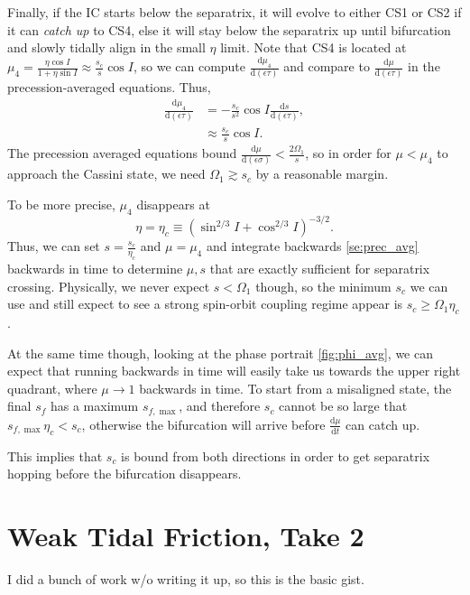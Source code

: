 \documentclass[11pt,
        usenames, %
        dvipsnames %
    ]{article}
\newcommand*{\rd}[2]{\frac{\mathrm{d}#1}{\mathrm{d}#2}}
\newcommand*{\p}[1]{\left(#1\right)}
\begin{document}
Finally, if the IC starts below the separatrix, it will evolve to either CS1 or
CS2 if it can \emph{catch up} to CS4, else it will stay below the separatrix up
until bifurcation and slowly tidally align in the small $\eta$ limit. Note that
CS4 is located at $\mu_4 = \frac{\eta \cos I}{1 + \eta \sin I} \approx
\frac{s_c}{s}\cos I$, so we can compute $\rd{\mu_4}{(\epsilon\tau)}$ and compare
to $\rd{\mu}{(\epsilon\tau)}$ in the precession-averaged equations. Thus,
\begin{align*}
    \rd{\mu_4}{(\epsilon \tau)} &= -\frac{s_c}{s^2}\cos I
            \rd{s}{(\epsilon\tau)},\\
        &\approx \frac{s_c}{s}\cos I.
\end{align*}
The precession averaged equations bound $\rd{\mu}{\p{\epsilon\sigma}} <
\frac{2\Omega_1}{s}$, so in order for $\mu < \mu_4$ to approach the Cassini
state, we need $\Omega_1 \gtrsim s_c$ by a reasonable margin.

To be more precise, $\mu_4$ disappears at
\begin{equation}
    \eta = \eta_c \equiv \p{\sin^{2/3}I + \cos^{2/3}I}^{-3/2}.
\end{equation}
Thus, we can set $s = \frac{s_c}{\eta_c}$ and $\mu = \mu_4$ and integrate
backwards \autoref{se:prec_avg} backwards in time to determine $\mu, s$ that are
exactly sufficient for separatrix crossing. Physically, we never expect $s <
\Omega_1$ though, so the minimum $s_c$ we can use and still expect to see a
strong spin-orbit coupling regime appear is $s_c \geq \Omega_1 \eta_c$.

At the same time though, looking at the phase portrait \autoref{fig:phi_avg}, we
can expect that running backwards in time will easily take us towards the upper
right quadrant, where $\mu \to 1$ backwards in time. To start from a misaligned
state, the final $s_f$ has a maximum $s_{f, \max}$, and therefore $s_c$ cannot
be so large that $s_{f, \max} \eta_c < s_c$, otherwise the bifurcation will
arrive before $\rd{\mu}{t}$ can catch up.

This implies that $s_c$ is bound from both directions in order to get separatrix
hopping before the bifurcation disappears.

\section{Weak Tidal Friction, Take 2}

I did a bunch of work w/o writing it up, so this is the basic gist.
\end{document}
